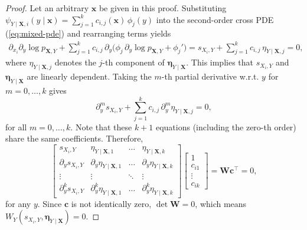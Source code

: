 \documentclass{article}
\theoremstyle{plain}
\theoremstyle{definition}
\theoremstyle{remark}
\begin{document}
\wronskian*
\begin{proof}
Let an arbitrary $\bm{x}$ be given in this proof. Substituting $\psi_{Y\mid\bm{X},i}(y\!\mid\!\bm{x})=\sum_{j=1}^kc_{i,j}(\bm{x})\,\phi_j(y)$ into the second-order cross PDE (\cref{eq:mixed-pde}) and rearranging terms yields
\begin{align}
\label{eq:wronskian-1}
\partial_{x_i}\partial_y\log p_{\bm{X},Y}+\sum_{j=1}^kc_{i,j}\,\partial_y\big(\phi_j\,\partial_y\log p_{\bm{X},Y}+\phi_j'\big)=s_{X_i,Y}+\sum_{j=1}^kc_{i,j}\,\eta_{Y\mid\bm{X},j}=0,
\end{align}
where $\eta_{Y\mid\bm{X},j}$ denotes the $j$-th component of $\bm{\eta}_{Y\mid\bm{X}}$. This implies that $s_{X_i,Y}$ and $\bm{\eta}_{Y\mid\bm{X}}$ are linearly dependent. Taking the $m$-th partial derivative w.r.t. $y$ for $m=0,\dots,k$ gives
\[\partial^m_ys_{X_i,Y}+\sum_{j=1}^kc_{i,j}\,\partial^m_y\eta_{Y\mid\bm{X},j}=0,\]
for all $m=0,\dots,k$. Note that these $k+1$ equations (including the zero-th order) share the same coefficients. Therefore,
\[\begin{bmatrix}s_{X_i,Y}&\eta_{Y\mid\bm{X},1}&\dots&\eta_{Y\mid\bm{X},k}\\\partial_ys_{X_i,Y}&\partial_y\eta_{Y\mid\bm{X},1}&\dots&\partial_y\eta_{Y\mid\bm{X},k}\\\vdots&\vdots&\ddots&\vdots\\\partial^{k}_ys_{X_i,Y}&\partial^{k}_y\eta_{Y\mid\bm{X},1}&\dots&\partial^{k}_y\eta_{Y\mid\bm{X},k}\end{bmatrix}\begin{bmatrix}1\\c_{i1}\\\vdots\\c_{ik}\end{bmatrix}=\bm{W}\bm{c}^\intercal=0,\]
for any $y$. Since $\bm{c}$ is not identically zero, $\det\bm{W}=0$, which means $W_Y(s_{X_i,Y},\bm{\eta}_{Y\mid\bm{X}})=0$.


\end{proof}
\end{document}

